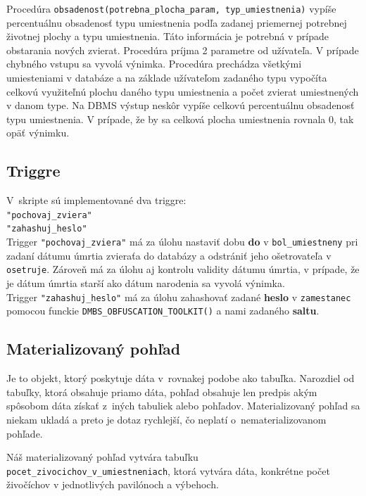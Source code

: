 \documentclass[a4paper, 11pt]{article}
\begin{document}
	Procedúra \texttt{obsadenost(potrebna\_plocha\_param, typ\_umiestnenia)} vypíše percentuálnu obsadenosť typu umiestnenia podľa zadanej priemernej potrebnej životnej plochy a typu umiestnenia. Táto informácia je potrebná v prípade obstarania nových zvierat. Procedúra príjma 2 parametre od užívateľa. V prípade chybného vstupu sa vyvolá výnimka. Procedúra prechádza všetkými umiesteniami v databáze a na základe užívateľom zadaného typu vypočíta celkovú využiteľnú plochu daného typu umiestnenia a počet zvierat umiestnených v danom type. Na DBMS výstup neskôr vypíše celkovú percentuálnu obsadenosť typu umiestnenia. V prípade, že by sa celková plocha umiestnenia rovnala 0, tak opäť výnimku.
	
	\subsection{Triggre}
	V~skripte sú implementované dva triggre: \\
	\texttt{"pochovaj\_zviera"}\\
	\texttt{"zahashuj\_heslo"}\\
	
	Trigger \texttt{"pochovaj\_zviera"} má za úlohu nastaviť dobu \textbf{do} v \texttt{bol\_umiestneny} pri zadaní dátumu úmrtia zvieraťa do databázy a odstrániť jeho ošetrovateľa v \texttt{osetruje}. Zároveň má za úlohu aj kontrolu validity dátumu úmrtia, v prípade, že je dátum úmrtia starší ako dátum narodenia sa vyvolá výnimka.\\
	
	Trigger \texttt{"zahashuj\_heslo"} má za úlohu zahashovať zadané \textbf{heslo} v \texttt{zamestanec} pomocou funckie \texttt{DMBS\_OBFUSCATION\_TOOLKIT()} a nami zadaného \textbf{saltu}.
	
	\subsection{Materializovaný pohľad}
	Je to objekt, ktorý poskytuje dáta v~rovnakej podobe ako tabuľka. Narozdiel od tabuľky, ktorá obsahuje priamo dáta, pohľad obsahuje len predpis akým spôsobom dáta získať z~iných tabuliek alebo pohľadov. Materializovaný pohľad sa niekam ukladá a preto je dotaz rychlejší, čo neplatí o~nematerializovanom pohľade.\\
	\par Náš materializovaný pohľad vytvára tabuľku \texttt{pocet\_zivocichov\_v\_umiestneniach}, ktorá vytvára dáta, konkrétne počet živočíchov v jednotlivých pavilónoch a výbehoch.
\end{document}
